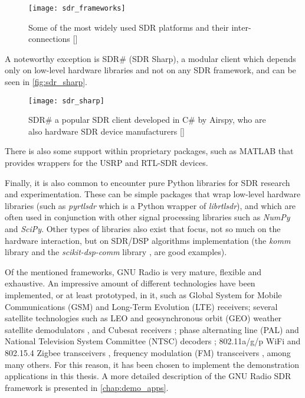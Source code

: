 \begin{figure}[ht]
  \centering
  \texttt{[image: sdr\_frameworks]}
  \caption{Some of the most widely used SDR platforms and their inter-connections [\citeauthor{pothossdr_project}]}
  \label{fig:sdr_frameworks}
\end{figure}

A noteworthy exception is SDR\# (SDR Sharp), a modular client which depends only on low-level hardware libraries and not on any SDR framework, and can be seen in \autoref{fig:sdr_sharp}.

\begin{figure}[ht]
  \centering
  \texttt{[image: sdr\_sharp]}
  \caption[SDR\# a popular SDR client]{SDR\# a popular SDR client developed in C\# by Airspy, who are also hardware SDR device manufacturers [\citeauthor{image:sdr_sharp_image}]}
  \label{fig:sdr_sharp}
\end{figure}

There is also some support within proprietary packages, such as MATLAB that provides wrappers for the USRP and RTL-SDR devices.

Finally, it is also common to encounter pure Python libraries for SDR research and experimentation. These can be simple packages that wrap low-level hardware libraries (such as \emph{pyrtlsdr} which is a Python wrapper of \emph{librtlsdr}), and which are often used in conjunction with other signal processing libraries such as \emph{NumPy} and \emph{SciPy}. Other types of libraries also exist that focus, not so much on the hardware interaction, but on SDR/DSP algorithms implementation (the \emph{komm} library \cite{komm_project} and the \emph{scikit-dsp-comm} library \cite{scikit-dsp-comm_project}, are good examples).

Of the mentioned frameworks, GNU Radio is very mature, flexible and exhaustive. An impressive amount of different technologies have been implemented, or at least prototyped, in it, such as Global System for Mobile Communications (GSM) \cite{gr-gsm} and Long-Term Evolution (LTE) \cite{gr-lte} receivers; several satellite technologies such as LEO and geosynchronous orbit (GEO) weather satellite demodulators \cite{meteor_m2_decoding}, and Cubesat receivers \cite{icssc16}; phase alternating line (PAL) and National Television System Committee (NTSC) decoders \cite{pal_decoder} \cite{ntsc_decoder}; 802.11a/g/p WiFi and 802.15.4 Zigbee transceivers \cite{wime_project}, frequency modulation (FM) transceivers \cite{gnuradio_wbfm_receiver}, among many others. For this reason, it has been chosen to implement the demonstration applications in this thesis. A more detailed description of the GNU Radio SDR framework is presented in \autoref{chap:demo_apps}.

